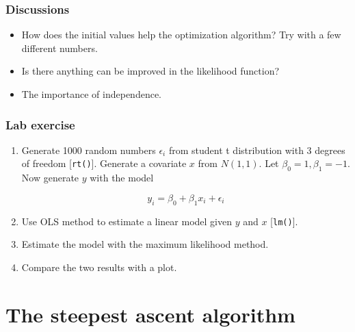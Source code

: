 \documentclass[10pt]{beamer}
\begin{document}
\begin{frame}
  \frametitle{Discussions}

  \begin{itemize}
  \item How does the initial values help the optimization algorithm?
    Try with a few different numbers.

  \item Is there anything can be improved in the likelihood function?

  \item The importance of independence.
  \end{itemize}
\end{frame}

\begin{frame}
  \frametitle{Lab exercise}


    \begin{enumerate}
    \item Generate 1000 random numbers $\epsilon_i$ from student t distribution
      with 3 degrees of freedom [\texttt{rt()}]. Generate a covariate $x$
      from $N(1,1)$. Let $\beta_0=1,\beta_1=-1$. Now generate $y$ with
      the model

      \begin{equation*}
        y_i= \beta_0 + \beta_1 x_i + \epsilon_i
      \end{equation*}

    \item Use OLS method to estimate a linear model given $y$ and $x$
      [\texttt{lm()}].

    \item Estimate the model with the maximum likelihood method.

    \item Compare the two results with a plot.
    \end{enumerate}
  \end{frame}


\section{The steepest ascent algorithm}
\end{document}
